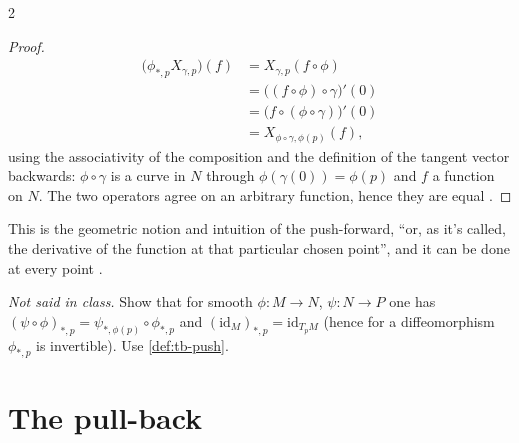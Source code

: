 \begin{paracol}{2}
\begin{proof}
\[\begin{aligned}
  \bigl(\phi_{*,p}X_{\gamma,p}\bigr)(f)&=X_{\gamma,p}(f\circ\phi)\\
  &=\bigl((f\circ\phi)\circ\gamma\bigr)'(0)\\
  &=\bigl(f\circ(\phi\circ\gamma)\bigr)'(0)\\
  &=X_{\phi\circ\gamma,\phi(p)}(f),
\end{aligned}\]
using the associativity of the composition and the definition of the tangent vector backwards: $\phi\circ\gamma$ is a curve in $N$ through $\phi(\gamma(0))=\phi(p)$ and $f$ a function on $N$. The two operators agree on an arbitrary function, hence they are equal      .
\end{proof}
This is the geometric notion and intuition of the push-forward, ``or, as it's called, the derivative of the function at that particular chosen point'', and it can be done at every point  .
\begin{exercise}\label{ex:tb-chain}
\emph{Not said in class.} Show that for smooth $\phi\colon M\to N$, $\psi\colon N\to P$ one has $(\psi\circ\phi)_{*,p}=\psi_{*,\phi(p)}\circ\phi_{*,p}$ and $(\mathrm{id}_M)_{*,p}=\mathrm{id}_{T_pM}$ (hence for a diffeomorphism $\phi_{*,p}$ is invertible). Use \cref{def:tb-push}.
\end{exercise}

\section{The pull-back}\label{sec:tb-pullback}


\end{paracol}
